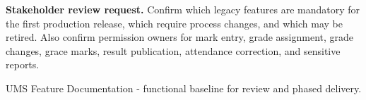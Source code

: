 \documentclass[10pt,a4paper]{article}
\begin{document}
\begin{scopebox}
\textbf{Stakeholder review request.} Confirm which legacy features are mandatory
for the first production release, which require process changes, and which may
be retired. Also confirm permission owners for mark entry, grade assignment,
grade changes, grace marks, result publication, attendance correction, and
sensitive reports.
\end{scopebox}

\vfill
\begin{center}
\small\color{TextGray}
UMS Feature Documentation - functional baseline for review and phased delivery.
\end{center}
\end{document}

